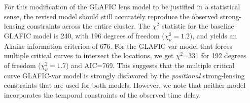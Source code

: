 For this modification of the GLAFIC lens model to be justified in a
statistical sense, the revised model should still accurately reproduce
the observed strong-lensing constraints across the entire cluster.
The $\chi^2$ statistic for the baseline GLAFIC model is 240, with 196
degrees of freedom ($\chi^2_\nu=1.2$), and yields an Akaike
information criterion \citep[AIC][]{Akaike:1974} of 676.  For the
GLAFIC-var model that forces multiple critical curves to intersect the
\spock locations, we get $\chi^2$=331 for 192 degrees of freedom
($\chi^2_\nu=1.7$) and AIC=769.  This suggests that the multiple
critical curve GLAFIC-var model is strongly disfavored by the
{\it positional} strong-lensing constraints that are used for both models.
However, we note that neither model incorporates the temporal
constraints of the observed time delay. 
